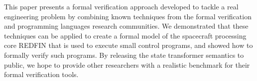 This paper presents a formal verification approach developed to tackle a real
engineering problem by combining known techniques from the formal verification
and programming languages research communities. We demonstrated that these
techniques can be applied to create a formal model of the spacecraft processing
core REDFIN that is used to execute small control programs, and showed how to
formally verify such programs. By releasing the state transformer semantics to
public, we hope to provide other researchers with a realistic benchmark for
their formal verification tools.

